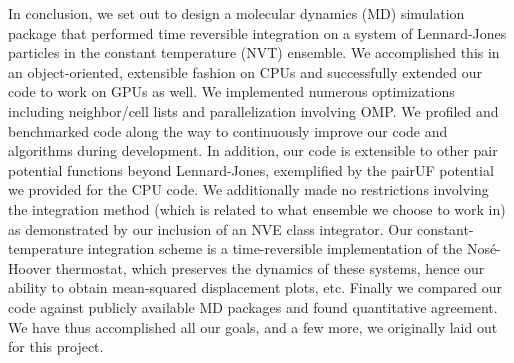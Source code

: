 \documentclass[12pt]{article}
\begin{document}
In conclusion, we set out to design a molecular dynamics (MD) simulation package that performed time reversible integration on a system of Lennard-Jones particles in the constant temperature (NVT) ensemble.  We accomplished this in an object-oriented, extensible fashion on CPUs and successfully extended our code to work on GPUs as well.  We implemented numerous optimizations including neighbor/cell lists and parallelization involving OMP.  We profiled and benchmarked code along the way to continuously improve our code and algorithms during development.  In addition, our code is extensible to other pair potential functions beyond Lennard-Jones, exemplified by the pairUF potential we provided for the CPU code.  We additionally made no restrictions involving the integration method (which is related to what ensemble we choose to work in) as demonstrated by our inclusion of an NVE class integrator.  Our constant-temperature integration scheme is a time-reversible implementation of the Nos\'{e}-Hoover thermostat, which preserves the dynamics of these systems, hence our ability to obtain mean-squared displacement plots, etc.  Finally we compared our code against publicly available MD packages and found quantitative agreement.  We have thus accomplished all our goals, and a few more, we originally laid out for this project.



\pagebreak


\end{document}
